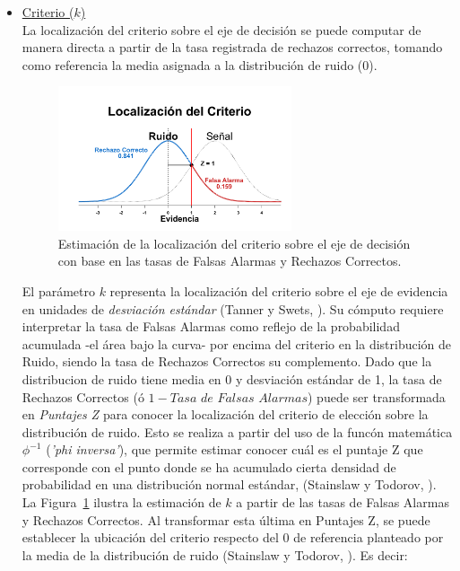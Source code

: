 \begin{itemize}
\item \underline{Criterio ($k$)}\\

La localización del criterio sobre el eje de decisión se puede computar de manera directa a partir de la tasa registrada de rechazos correctos, tomando como referencia la media asignada a la distribución de ruido ($0$). \\

\begin{figure}[th]
\centering
\includegraphics[width=0.65\textwidth]{Figures/Graficador_CriterioR} 
\caption[Estimación paramétrica: La localización del criterio]{Estimación de la localización del criterio sobre el eje de decisión con base en las tasas de Falsas Alarmas y Rechazos Correctos.}
\label{fig:Graf_Criterio}
\end{figure}

El parámetro $k$ representa la localización del criterio sobre el eje de evidencia en unidades de \textit{desviación estándar} (Tanner y Swets, \citeyear{Tanner1954}). Su cómputo requiere interpretar la tasa de Falsas Alarmas como reflejo de la probabilidad acumulada -el área bajo la curva- por encima del criterio en la distribución de Ruido, siendo la tasa de Rechazos Correctos su complemento. Dado que la distribucion de ruido tiene media en 0 y desviación estándar de 1, la tasa de Rechazos Correctos (ó $1 - Tasa$ $de$ $Falsas$ $Alarmas$) puede ser transformada en \textit{Puntajes Z} para conocer la localización del criterio de elección sobre la distribución de ruido. Esto se realiza a partir del uso de la funcón matemática $\phi^{-1}$ (\textit{'phi inversa'}), que permite estimar conocer cuál es el puntaje Z que corresponde con el punto donde se ha acumulado cierta densidad de probabilidad en una distribución normal estándar, (Stainslaw y Todorov, \citeyear{Stainslaw1999}).\\

La Figura~\ref{fig:Graf_Criterio} ilustra la estimación de $k$ a partir de las tasas de Falsas Alarmas y Rechazos Correctos. Al transformar esta última en Puntajes Z, se puede establecer la ubicación del criterio respecto del 0 de referencia planteado por la media de la distribución de ruido (Stainslaw y Todorov, \citeyear{Stainslaw1999}). Es decir:\\


\end{itemize}
